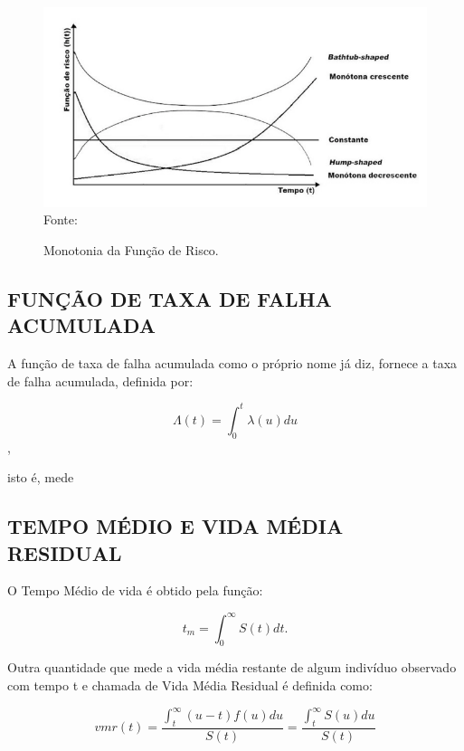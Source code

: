 \begin{figure}[h!]
	\centering
	\caption{Monotonia da Função de Risco.}
	\includegraphics[scale=0.65]{img/fig3} \\
	Fonte: 
	\label{fig:figura3}
\end{figure}

		  \subsection{FUNÇÃO DE TAXA DE FALHA ACUMULADA}
			
A função de taxa de falha acumulada como o próprio nome já diz, fornece a taxa de falha acumulada, definida por:

\begin{equation}\label{eq:falha-acumulada}
	\Lambda(t) = \int_{0}^{t}\lambda(u)du
\end{equation},

\noindent isto é, mede 
			
      \subsection{TEMPO MÉDIO E VIDA MÉDIA RESIDUAL}

O Tempo Médio de vida é obtido pela função:

\begin{equation}\label{eq:tm}
	t_m = \int_{0}^{\infty} S(t)dt.
\end{equation}

Outra quantidade que mede a vida média restante de algum indivíduo observado com tempo t e chamada de Vida Média Residual é definida como:

\begin{equation}\label{eq:tm-vmr}
	vmr(t) = \frac{\int_{t}^{\infty}(u - t)f(u)du}{S(t)} = \frac{\int_{t}^{\infty}S(u)du}{S(t)}
\end{equation}

